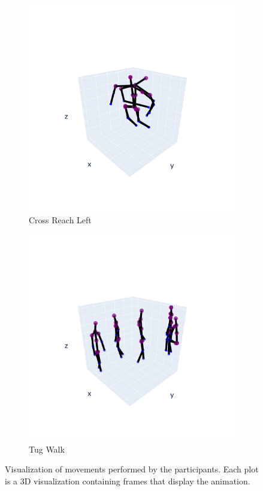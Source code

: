 \begin{figure}[h]
            \begin{subfigure}{.5\textwidth}
                \centering
                \includegraphics[width=.9\linewidth]{../src/resources/plots/movements/mov-2.png}
                \caption{Cross Reach Left}
                \label{fig:mov-2}
            \end{subfigure}
            \begin{subfigure}{.5\textwidth}
                \centering
                \includegraphics[width=.9\linewidth]{../src/resources/plots/movements/mov-9.png}
                \caption{Tug Walk}
                \label{fig:mov-9}
            \end{subfigure}
            
            \caption{Visualization of movements performed by the participants. Each plot is a 3D visualization containing frames that display the animation.}
            \label{fig:movements_visualization}
        \end{figure}


